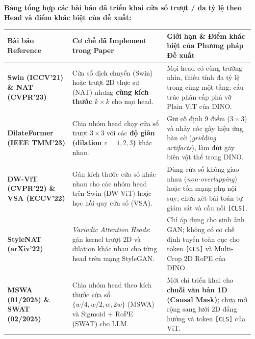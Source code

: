 \documentclass[10pt,a4paper]{article}
\begin{document}
\textbf{Bảng tổng hợp các bài báo đã triển khai cửa sổ trượt / đa tỷ lệ theo Head và điểm khác biệt của đề xuất:}

{\footnotesize
\renewcommand{\arraystretch}{1.05}
\begin{tabularx}{\textwidth}{>{\raggedright\arraybackslash\bfseries}p{3.2cm} >{\raggedright\arraybackslash}p{4.5cm} >{\raggedright\arraybackslash}X}
\toprule
\textbf{Bài báo Reference} & \textbf{Cơ chế đã Implement trong Paper} & \textbf{Giới hạn \& Điểm khác biệt của Phương pháp Đề xuất} \\
\midrule
Swin \cite{liu2021swin} (ICCV'21) \& NAT \cite{hassani2023neighborhood} (CVPR'23) & Cửa sổ dịch chuyển (Swin) hoặc trượt 2D thực sự (NAT) nhưng \textbf{cùng kích thước $k\times k$} cho mọi head. & Mọi head có cùng trường nhìn, thiếu tính đa tỷ lệ trong cùng một tầng; cấu trúc phân cấp phá vỡ Plain ViT của DINO. \\
\addlinespace[1pt]
DilateFormer \cite{jiao2023dilateformer} (IEEE TMM'23) & Chia nhóm head chạy cửa sổ trượt $3\times 3$ với các \textbf{độ giãn (dilation $r=1,2,3$)} khác nhau. & Giữ cố định 9 điểm ($3\times 3$) và nhảy cóc gây hiệu ứng bàn cờ (\textit{gridding artifacts}), làm đứt gãy biên vật thể trong DINO. \\
\addlinespace[1pt]
DW-ViT \cite{ren2022beyond} (CVPR'22) \& VSA \cite{zhang2022vsa} (ECCV'22) & Gán kích thước cửa sổ khác nhau cho các nhóm head trên Swin (DW-ViT) hoặc học hồi quy cửa sổ (VSA). & Dùng cửa sổ không giao nhau (\textit{non-overlapping}) hoặc tốn mạng phụ nội suy; chưa xét bài toán tự giám sát và cầu nối \texttt{[CLS]}. \\
\addlinespace[1pt]
StyleNAT \cite{walton2022stylenat} (arXiv'22) & \textit{Variadic Attention Heads}: gán kernel trượt 2D và dilation khác nhau cho từng head trên mạng StyleGAN. & Chỉ áp dụng cho sinh ảnh GAN; không có cơ chế định tuyến toàn cục cho token \texttt{[CLS]} và Multi-Crop 2D RoPE của DINO. \\
\addlinespace[1pt]
MSWA \cite{xu2025mswa} (01/2025) \& SWAT \cite{fu2025swat} (02/2025) & Chia nhóm head theo kích thước cửa sổ $\{w/4, w/2, w, 2w\}$ (MSWA) và Sigmoid + RoPE (SWAT) cho LLM. & Mới chỉ triển khai cho \textbf{chuỗi văn bản 1D (Causal Mask)}; chưa mở rộng sang lưới 2D đẳng hướng và token \texttt{[CLS]} của ViT. \\
\bottomrule
\end{tabularx}
}
\end{document}
